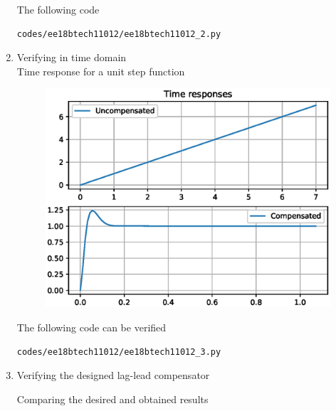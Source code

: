 \begin{enumerate}[label=\thesubsection.\arabic*.,ref=\thesubsection.\theenumi]
\begin{figure}[!ht]
\caption{}
\label{fig:ee18}
\end{figure}
The following code 
\begin{lstlisting}
codes/ee18btech11012/ee18btech11012_2.py
\end{lstlisting}
\item Verifying in time domain \\
\solution 
Time response for a unit step function
\begin{figure}[!ht]
\centering
  \includegraphics[width=\columnwidth]{./figs/ee18btech11012/ee18btech11012_3.eps}
\caption{}
\label{fig:2} 
\end{figure}
The following code can be verified
\begin{lstlisting}
codes/ee18btech11012/ee18btech11012_3.py
\end{lstlisting}
\item Verifying the designed lag-lead compensator \\
\solution 
\begin{table}[!ht]
\centering

\caption{Comparing the desired and obtained results}
\label{table:ee18btech11012_table1}
\end{table}
\end{enumerate}
